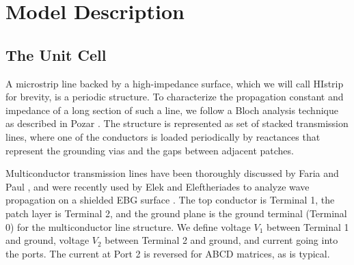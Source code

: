 \documentclass{allertonproc}
\begin{document}
\section{Model Description}
\subsection{The Unit Cell}
A microstrip line backed by a high-impedance surface, which we will call HIstrip for brevity, is a periodic structure.  To characterize the propagation constant and impedance of a long section of such a line, we follow a Bloch analysis technique as described in Pozar \cite{pozar}. The structure is represented as set of stacked transmission lines, where one of the conductors is loaded periodically by reactances that represent the grounding vias and the gaps between adjacent patches. 

Multiconductor transmission lines have been thoroughly discussed by Faria \cite{fariabook} and Paul \cite{paulbook}, and were recently used by Elek and Eleftheriades to analyze wave propagation on a shielded EBG surface \cite{elek}.  The top conductor is Terminal 1, the patch layer is Terminal 2, and the ground plane is the ground terminal (Terminal 0) for the multiconductor line structure.  We define voltage $V_1$ between Terminal 1 and ground, voltage $V_2$ between Terminal 2 and ground, and current going into the ports. The current at Port 2 is reversed for ABCD matrices, as is typical.
\end{document}
